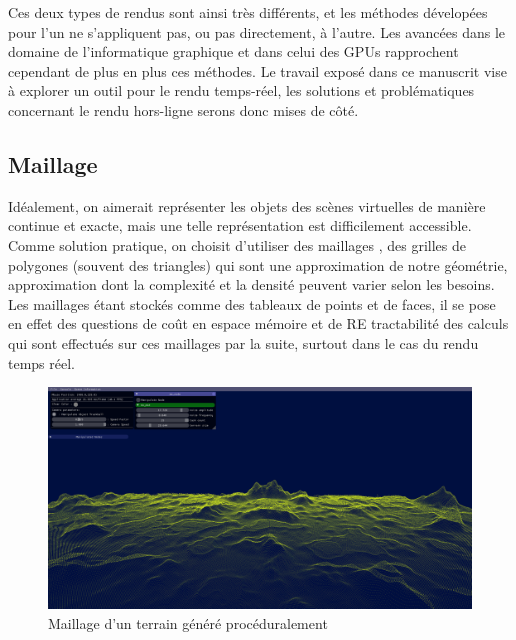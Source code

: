\bigskip

Ces deux types de rendus sont ainsi très différents, et les méthodes dévelopées pour l'un ne s'appliquent pas, ou pas directement, à l'autre. Les avancées dans le domaine de l'informatique graphique et dans celui des GPUs rapprochent cependant de plus en plus ces méthodes. Le travail exposé dans ce manuscrit vise à explorer un outil pour le rendu temps-réel, les solutions et problématiques concernant le rendu hors-ligne serons donc mises de côté.


\subsection*{Maillage}

Idéalement, on aimerait représenter les objets des scènes virtuelles de manière continue et exacte, mais une telle représentation est difficilement accessible. Comme solution pratique, on choisit d'utiliser des \og maillages \fg, des grilles de polygones (souvent des triangles) qui sont une approximation de notre géométrie, approximation dont la complexité et la densité peuvent varier selon les besoins. Les maillages étant stockés comme des tableaux de points et de faces, il se pose en effet des questions de coût en espace mémoire et de RE tractabilité des calculs qui sont effectués sur ces maillages par la suite, surtout dans le cas du rendu temps réel.

\begin{figure}[h!]
    \centering
    \includegraphics[width=\textwidth]{contenu/resources/images/full_terrain}
    \caption{Maillage d'un terrain généré procéduralement}
    \label{fig:procedural-mesh}
\end{figure}

